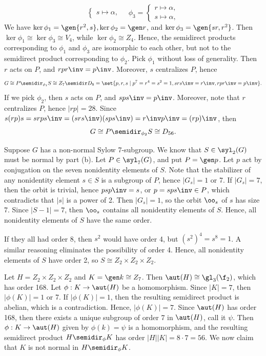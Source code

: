\begin{solalph}
\begin{itemize}
\[\begin{cases}
            s \mapsto \alpha,
        \end{cases} \quad
        \phi_3 =
        \begin{cases}
            r \mapsto \alpha, \\
            s \mapsto \alpha,
        \end{cases}\]
        We have $\ker\phi_1 = \gen{r^2, s}, \ker\phi_2 = \gen r$, and $\ker\phi_3 = \gen{sr, r^2}$. Then $\ker\phi_1 \cong \ker\phi_3 \cong V_4$, while $\ker\phi_2 \cong Z_4$. Hence, the semidirect products corresponding to $\phi_1$ and $\phi_3$ are isomorphic to each other, but not to the semidirect product corresponding to $\phi_2$. Pick $\phi_1$ without loss of generality. Then $r$ acts on $P$, and $rpr\inv = p\inv$. Moreover, $s$ centralizes $P$, hence
        \[G \cong P \semidir_{\phi_1} S \cong Z_7 \semidir D_8 = \set{p, r, s \mid p^7 = r^4 = s^2 = 1, srs\inv = r\inv, rpr\inv = p\inv}.\]
        If we pick $\phi_2$, then $s$ acts on $P$, and $sps\inv = p\inv$. Moreover, note that $r$ centralizes $P$, hence $|rp| = 28$. Since $s(rp)s = srps\inv = (srs\inv)(sps\inv) = r\inv p\inv = (rp)\inv$, then
        \[G \cong P \semidir_{\phi_2} S \cong D_{56}.\]
    \end{itemize}
    \item Suppose $G$ has a non-normal Sylow 7-subgroup. We know that $S \in \syl_2(G)$ must be normal by part (b). Let $P \in \syl_7(G)$, and put $P = \gen p$. Let $p$ act by conjugation on the seven nonidentity elements of $S$. Note that the stabilizer of any nonidentity element $s \in S$ is a subgroup of $P$, hence $|G_s| = 1$ or 7. If $|G_s| = 7$, then the orbit is trivial, hence $psp\inv = s$, or $p = sps\inv \in P$, which contradicts that $|s|$ is a power of 2. Then $|G_s| = 1$, so the orbit $\oo_s$ of $s$ has size 7. Since $|S - 1| = 7$, then $\oo_s$ contains all nonidentity elements of $S$. Hence, all nonidentity elements of $S$ have the same order.
    
    If they all had order 8, then $s^2$ would have order 4, but $(s^2)^4 = s^8 = 1$. A similar reasoning eliminates the possibility of order 4. Hence, all nonidentity elements of $S$ have order 2, so $S \cong Z_2 \times Z_2 \times Z_2$.
    \item Let $H = Z_2 \times Z_2 \times Z_2$ and $K = \gen k \cong Z_7$. Then $\aut(H) \cong \gl_3(\f_2)$, which has order 168. Let $\phi : K \to \aut(H)$ be a homomorphism. Since $|K| = 7$, then $|\phi(K)| = 1$ or 7. If $|\phi(K)| = 1$, then the resulting semidirect product is abelian, which is a contradiction. Hence, $|\phi(K)| = 7$. Since $\aut(H)$ has order 168, then there exists a unique subgroup of order 7 in $\aut(H)$, call it $\psi$. Then $\phi : K \to \aut(H)$ given by $\phi(k) = \psi$ is a homomorphism, and the resulting semidirect product $H \semidir_\phi K$ has order $|H||K| = 8 \cdot 7 = 56$. We now claim that $K$ is not normal in $H \semidir_\phi K$.
    

\end{solalph}

